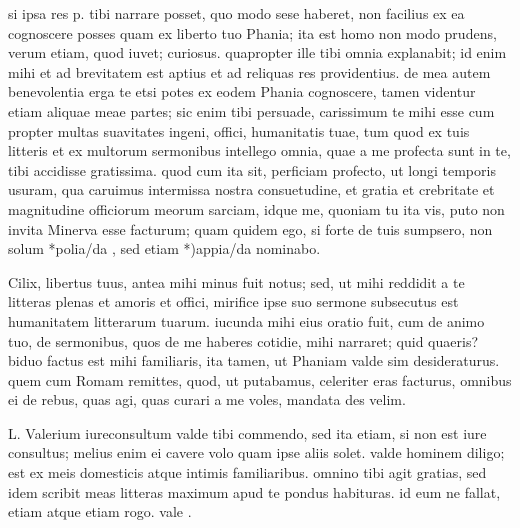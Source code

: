 


 si ipsa res p. tibi narrare posset, quo modo sese haberet, non facilius ex ea cognoscere posses quam ex liberto tuo Phania; ita est homo non modo prudens, verum etiam, quod iuvet; curiosus. quapropter ille tibi omnia explanabit; id enim mihi et ad brevitatem est aptius et ad reliquas res providentius. de mea autem benevolentia erga te etsi potes ex eodem Phania cognoscere, tamen videntur etiam aliquae meae partes; sic enim tibi persuade, carissimum te mihi esse cum propter multas suavitates ingeni, offici, humanitatis tuae, tum quod ex tuis litteris et ex multorum sermonibus intellego omnia, quae a me profecta sunt in te, tibi accidisse gratissima. quod cum ita sit, perficiam profecto, ut longi temporis usuram, qua caruimus intermissa nostra consuetudine, et gratia et crebritate et magnitudine officiorum meorum sarciam, idque me, quoniam tu ita vis, puto non invita Minerva esse facturum; quam quidem ego, si forte de tuis sumpsero, non solum *polia/da , sed etiam *)appia/da nominabo.

 Cilix, libertus tuus, antea mihi minus fuit notus; sed, ut mihi reddidit a te litteras plenas et amoris et offici, mirifice ipse suo sermone subsecutus est humanitatem litterarum tuarum. iucunda mihi eius oratio fuit, cum de animo tuo, de sermonibus, quos de me haberes cotidie, mihi narraret; quid quaeris? biduo factus est mihi familiaris, ita tamen, ut Phaniam valde sim desideraturus. quem cum Romam remittes, quod, ut putabamus, celeriter eras facturus, omnibus ei de rebus, quas agi, quas curari a me voles, mandata des velim.

 L. Valerium iureconsultum valde tibi commendo, sed ita etiam, si non est iure consultus; melius enim ei cavere volo quam ipse aliis solet. valde hominem diligo; est ex meis domesticis atque intimis familiaribus. omnino tibi agit gratias, sed idem scribit meas litteras maximum apud te pondus habituras. id eum ne fallat, etiam atque etiam rogo. vale .
